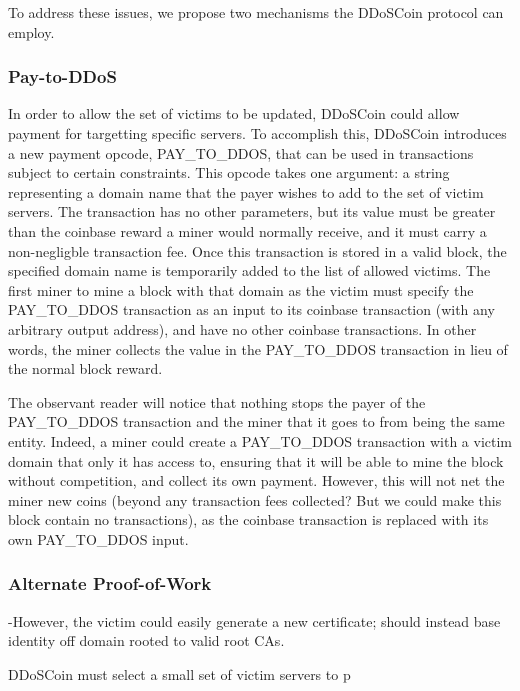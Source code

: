 To address these issues, we propose two mechanisms the DDoSCoin protocol can
employ.


\subsubsection{Pay-to-DDoS}

In order to allow the set of victims to be updated, DDoSCoin could allow payment
for targetting specific servers. To accomplish this, DDoSCoin introduces a new
payment opcode, PAY\_TO\_DDOS, that can be used in transactions subject to
certain constraints. This opcode takes one argument: a string representing a
domain name that the payer wishes to add to the set of victim servers. The
transaction has no other parameters, but its value must be greater than the
coinbase reward a miner would normally receive, and it must carry a
non-negligble transaction fee. Once this transaction is stored in a valid block,
the specified domain name is temporarily added to the list of allowed victims.
The first miner to mine a block with that domain as the victim must specify the
PAY\_TO\_DDOS transaction as an input to its coinbase transaction (with any
arbitrary output address), and have no other coinbase transactions. In other
words, the miner collects the value in the PAY\_TO\_DDOS transaction in lieu of
the normal block reward.

The observant reader will notice that nothing stops the payer of the
PAY\_TO\_DDOS transaction and the miner that it goes to from being the same
entity. Indeed, a miner could create a PAY\_TO\_DDOS transaction with a victim
domain that only it has access to, ensuring that it will be able to mine the
block without competition, and collect its own payment. However, this will not
net the miner new coins (\TK beyond any transaction fees collected? But we could
make this block contain no transactions), as the coinbase transaction is
replaced with its own PAY\_TO\_DDOS input. 


\subsubsection{Alternate Proof-of-Work}






-However, the victim could easily generate a new certificate; should instead
base identity off domain rooted to valid root CAs.


DDoSCoin must select a small set of victim servers to p


